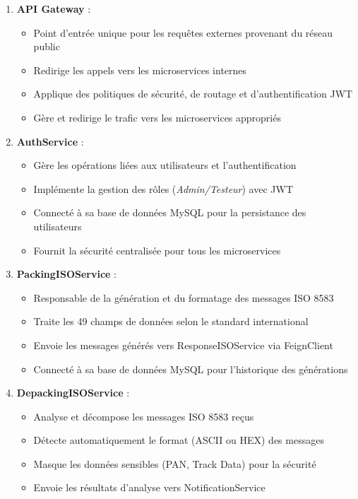 \begin{enumerate}[label=\alph*)]
    \item \textbf{API Gateway} :
    \begin{itemize}[label=\textbullet]
        \item Point d'entrée unique pour les requêtes externes provenant du réseau public
        \item Redirige les appels vers les microservices internes
        \item Applique des politiques de sécurité, de routage et d'authentification JWT
        \item Gère et redirige le trafic vers les microservices appropriés
    \end{itemize}

    \item \textbf{AuthService} :
    \begin{itemize}[label=\textbullet]
        \item Gère les opérations liées aux utilisateurs et l'authentification
        \item Implémente la gestion des rôles (\textit{Admin/Testeur}) avec JWT
        \item Connecté à sa base de données MySQL pour la persistance des utilisateurs
        \item Fournit la sécurité centralisée pour tous les microservices
    \end{itemize}

    \item \textbf{PackingISOService} :
    \begin{itemize}[label=\textbullet]
        \item Responsable de la génération et du formatage des messages ISO 8583
        \item Traite les 49 champs de données selon le standard international
        \item Envoie les messages générés vers ResponseISOService via FeignClient
        \item Connecté à sa base de données MySQL pour l'historique des générations
    \end{itemize}

    \item \textbf{DepackingISOService} :
    \begin{itemize}[label=\textbullet]
        \item Analyse et décompose les messages ISO 8583 reçus
        \item Détecte automatiquement le format (ASCII ou HEX) des messages
        \item Masque les données sensibles (PAN, Track Data) pour la sécurité
        \item Envoie les résultats d'analyse vers NotificationService
    \end{itemize}


\end{enumerate}
